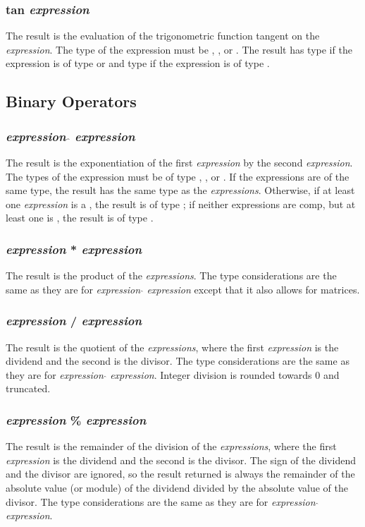 \subsubsection{tan \textit{expression}}
The result is the evaluation of the trigonometric function tangent on the \textit{expression}. The type of the expression must be \integ, \float, or  \complex. The result has type \float if the expression is of type \integ or \float and type \complex if the expression is of type  \complex. 
\subsection{Binary Operators}
\subsubsection{\textit{expression} $\hat{}$ \textit{expression}}
The result is the exponentiation of the first \textit{expression} by the second \textit{expression}. The types of the expression must be of type \integ, \float, or  \complex. If the expressions are of the same type, the result has the same type as the \textit{expressions}. Otherwise, if at least one \textit{expression} is a \complex, the result is of type \complex; if neither expressions are comp, but at least one is \float, the result is of type \float.
\subsubsection{\textit{expression} * \textit{expression}}
The result is the product of the \textit{expressions}. The type considerations are the same as they are for \textit{expression} $\hat{}$ \textit{expression} except that it also allows for matrices.
\subsubsection{\textit{expression} / \textit{expression}}
The result is the quotient of the \textit{expressions}, where the first \textit{expression} is the dividend and the second is the divisor. The type considerations are the same as they are for \textit{expression} $\hat{}$ \textit{expression}. Integer division is rounded towards 0 and truncated. 
\subsubsection{\textit{expression} \% \textit{expression}}
The result is the remainder of the division of the \textit{expressions}, where the first \textit{expression} is the dividend and the second is the divisor. The sign of the dividend and the divisor are ignored, so the result returned is always the remainder of the absolute value (or module) of the dividend divided by the absolute value of the divisor. The type considerations are the same as they are for \textit{expression} $\hat{}$ \textit{expression}.
